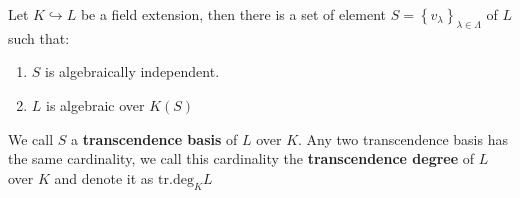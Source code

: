 \documentclass{note-eng}
\begin{document}
\begin{theorem}
    Let $K \hookrightarrow L$ be a field extension, then there is a set of element $S = \left\lbrace v_\lambda \right\rbrace_{\lambda \in \Lambda}$ of $L$ such that:
    \begin{enumerate}
        \item $S$ is algebraically independent.
        \item $L$ is algebraic over $K(S)$
    \end{enumerate}
    We call $S$ a \textbf{transcendence basis} of $L$ over $K$. Any two transcendence basis has the same cardinality, we call this cardinality the \textbf{transcendence degree} of $L$ over $K$ and denote it as $\mathrm{tr}.\mathrm{deg}_KL$
\end{theorem}
\end{document}
